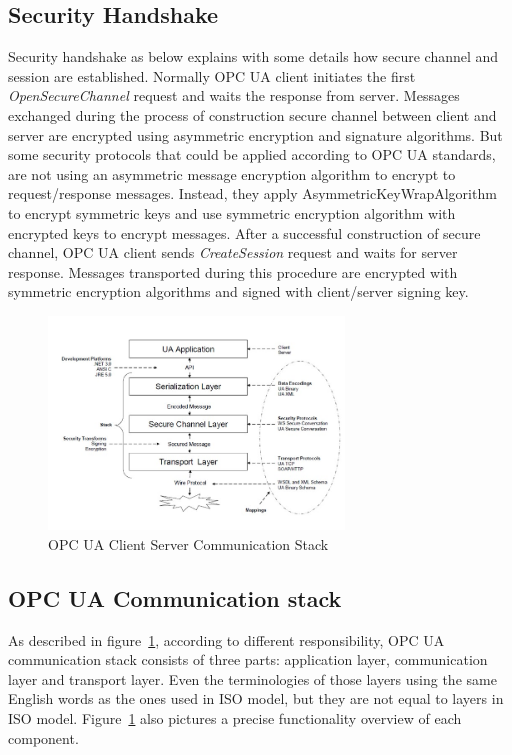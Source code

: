 \subsection{Security Handshake}
Security handshake as below explains with some details how secure channel and session are established. Normally OPC UA client initiates the first \emph{OpenSecureChannel} request and waits the response from server. Messages exchanged during the process of construction secure channel between client and server are encrypted using asymmetric encryption and signature algorithms. But some security protocols that could be applied according to OPC UA standards, are not using an asymmetric message encryption algorithm to encrypt to request/response messages. Instead, they apply AsymmetricKeyWrapAlgorithm to encrypt symmetric keys and use symmetric encryption algorithm with encrypted keys to encrypt messages. After a successful construction of secure channel, OPC UA client sends \emph{CreateSession} request and waits for server response. Messages transported during this procedure are encrypted with symmetric encryption algorithms and signed with client/server signing key.
\begin{figure}[!htbp]
	\centering
	\includegraphics[width=0.7\textwidth]{opc_ua_commstack.jpg}
		\caption{OPC UA Client Server Communication Stack\cite{O2}}
	\label{fig:opc_ua_commstack}
\end{figure}

\subsection{OPC UA Communication stack}
As described in figure~\ref{fig:opc_ua_commstack}, according to different responsibility, OPC UA communication stack consists of three parts: application layer, communication layer and transport layer. Even the terminologies of those layers using the same English words as the ones used in ISO model, but they are not equal to layers in ISO model. Figure~\ref{fig:opc_ua_commstack} also pictures a precise functionality overview of each component.

